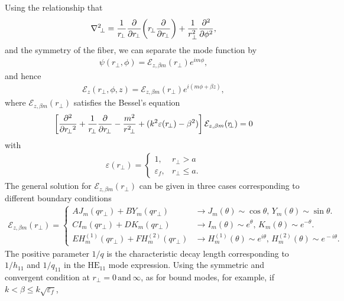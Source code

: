 Using the relationship that
\begin{align}
\nabla^2 \!_\perp = \frac{1}{r_{\!\perp}}\frac{\partial {}}{\partial {r\!_\perp}}\! \left(r\!_\perp \frac{\partial {}}{\partial {r\!_\perp}} \right) + 
\frac{1}{r_\perp^2} \frac{\partial^2 {}}{\partial {\phi}^2},
\end{align}
and the symmetry of the fiber,  we can  separate the mode function by
\begin{align}
\psi(r\!_\perp,\phi)=\mathcal{E}_{z,\beta m}(r\!_\perp)e^{im\phi},
\end{align} 
and hence
\begin{align}
\mathcal{E}_z(r\!_\perp,\phi,z) = \mathcal{E}_{z,\beta m}(r\!_\perp)e^{i(m\phi+\beta z)},
\end{align}
where $ \mathcal{E}_{z,\beta m}(r\!_\perp) $ satisfies the Bessel's equation
\begin{align}
\left[ \frac{\partial^2 {}}{\partial {r\!_\perp}^2}+ \frac{1}{r_{\!\perp}}\frac{\partial {}}{\partial {r\!_\perp}}- 
\frac{m^2}{r^2\!_\perp} + (k^2\varepsilon(r\!_\perp)-\beta^2) \right] 
\mathcal{E}_{z,\beta m}(r\!\!_\perp)=0
\end{align}
with 
\begin{align}
\varepsilon(r\!\!_\perp) = 
\begin{cases}
1, & r\!_\perp>a\\
\varepsilon_f, & r\!_\perp\leq a.
\end{cases}
\end{align}
The general solution for $ \mathcal{E}_{z,\beta m}(r\!\!_\perp) $ can be given in three cases 
corresponding to different 
boundary conditions
\begin{align}
\mathcal{E}_{z,\beta m}(r\!\!_\perp) = \begin{cases}
AJ_m(qr\!\!_\perp) + B Y_m(qr\!_\perp)&\rightarrow J_m(\theta)\sim \cos\theta,\, Y_m(\theta)\sim 
\sin\theta.\\
CI_m(qr\!_\perp) + DK_m(qr\!_\perp) & \rightarrow I_m(\theta) \sim e^\theta,\, K_m(\theta) \sim 
e^{-\theta}.\\
EH_m^{(\!1\!)}(qr\!_\perp) \!+\! FH_m^{(\!2\!)}(qr\!_\perp ) & \rightarrow H_m^{(\!1\!)} (\theta) \! \sim \! 
e^{i\theta},\, 
H_m^{(\!2\!)}(\theta)\!\sim\! e^{\!-i\theta}.
\end{cases}
\end{align}
The positive parameter $ 1/q $ is the characteristic decay length corresponding to $ 1/h_{11} $ and $ 
1/q_{11} $ 
in the $\text{HE}_{11}$ mode expression. Using the symmetric and convergent condition at $ 
r\!_\perp=0\,\text{and}\, \infty $, as for bound modes, for example, if $k< \beta\leq 
k\sqrt{\varepsilon_f}$,
